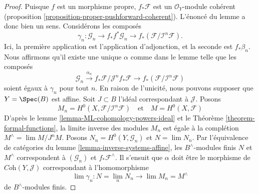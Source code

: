 \begin{proof}
Puisque $f$ est un morphisme propre, $f_*\mathcal{F}$
est un $\mathcal{O}_Y$-module cohérent
(proposition \ref{proposition-proper-pushforward-coherent}).
L'énoncé du lemme a donc bien un sens.
Considérons les composés
$$
\gamma_n : \mathcal{G}_n \to
f_*f^*\mathcal{G}_n \to
f_*(\mathcal{F}/\mathcal{I}^n\mathcal{F}).
$$
Ici, la première application est l'application d'adjonction, et la seconde est $f_*\beta_n$.
Nous affirmons qu'il existe une unique $\alpha$ comme dans le lemme
telle que les composés
$$
\mathcal{G}_n \xrightarrow{\alpha_n}
f_*\mathcal{F}/\mathcal{J}^nf_*\mathcal{F} \to
f_*(\mathcal{F}/\mathcal{I}^n\mathcal{F})
$$
soient égaux à $\gamma_n$ pour tout $n$. En raison de l'unicité, nous pouvons supposer
que $Y = \Spec(B)$ est affine. Soit $J \subset B$ l'idéal correspondant
à $\mathcal{J}$. Posons
$$
M_n = H^0(X, \mathcal{F}/\mathcal{I}^n\mathcal{F})
\quad\text{et}\quad
M = H^0(X, \mathcal{F})
$$
D'après le lemme \ref{lemma-ML-cohomology-powers-ideal} et le
Théorème \ref{theorem-formal-functions},
la limite inverse des modules
$M_n$ est égale à la complétion $M^\wedge = \lim M/J^nM$.
Posons $N_n = H^0(Y, \mathcal{G}_n)$ et $N = \lim N_n$.
Par l'équivalence de catégories du
lemme \ref{lemma-inverse-systems-affine},
les $B^\wedge$-modules finis $N$ et $M^\wedge$ correspondent
à $(\mathcal{G}_n)$ et $f_*\mathcal{F}^\wedge$.
Il s'ensuit que $\alpha$ doit être le morphisme de
$\textit{Coh}(Y, \mathcal{J})$ correspondant à l'homomorphisme
$$
\lim \gamma_n : N = \lim_n N_n \longrightarrow \lim M_n = M^\wedge
$$
de $B^\wedge$-modules finis.


\end{proof}
